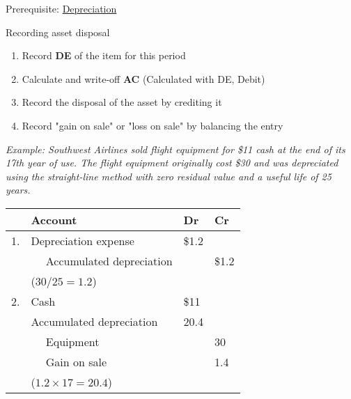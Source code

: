 Prerequisite: \hyperref[subsec:depreciation]{Depreciation}

\begin{theorem}
    {Recording asset disposal}
    \begin{enumerate}
        \item Record \textbf{DE} of the item for this period
        \item Calculate and write-off \textbf{AC} (Calculated with DE, Debit)
        \item Record the disposal of the asset by crediting it
        \item Record "gain on sale" or "loss on sale" by balancing the entry
    \end{enumerate}
    \tcblower
    \textit{Example: Southwest Airlines sold flight equipment for \$11 cash at the end of its 17th year of use. The flight equipment originally cost \$30 and was depreciated using the straight-line method with zero residual value and a useful life of 25 years.}

    \begin{tabular}{llll}
           & \textbf{Account}                 & \textbf{Dr} & \textbf{Cr} \\
        \hline
        1. & Depreciation expense             & \$1.2       &             \\
           & $\quad$ Accumulated depreciation &             & \$1.2       \\
           & (${30}/{25}=1.2$)                &             &             \\
        \hline
        2. & Cash                             & \$11        &             \\
           & Accumulated depreciation         & 20.4        &             \\
           & $\quad$ Equipment                &             & 30          \\
           & $\quad$ Gain on sale             &             & 1.4         \\
           & ($1.2 \times 17=20.4$)           &             &             \\
    \end{tabular}
\end{theorem}
